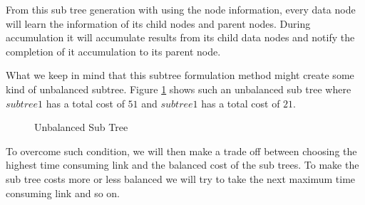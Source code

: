 \documentclass[12pt,notitlepage,oneside]{report}
\begin{document}
From this sub tree generation with using the node information, every data node will learn the information of its child nodes and parent nodes. During accumulation it will accumulate results from its child data nodes and notify the completion of it accumulation to its parent node.  

What we keep in mind that this  subtree formulation method might create some kind of unbalanced subtree. Figure \ref{uMST} shows such an unbalanced sub tree where $subtree1$ has a total cost of $51$ and $subtree1$ has a total cost of $21$.

\begin{figure}[!htbp]
	\centering
	\caption{Unbalanced Sub Tree}
	\label{uMST}
\end{figure}

To overcome such condition, we will then make a trade off between choosing the highest time consuming link and the balanced cost of the sub trees. To make the sub tree costs more or less balanced we will try to take the next maximum time consuming link and so on. 
\end{document}
